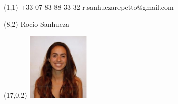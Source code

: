 \documentclass{tccv}
\begin{document}

\begin{minipage}{\textwidth} 
\begin{textblock}{6.5}(1,1)
    {+33 07 83 88 33 32}
    {r.sanhuezarepetto@gmail.com}
\end{textblock}

\begin{textblock}{5}(8,2)
     Roc\'io Sanhueza
\end{textblock}

\begin{textblock}{21}(17,0.2)
		\includegraphics[width=3cm]{../Figure/Rocio1.png}
\end{textblock}  

\end{minipage}

\vspace*{-1cm}
\end{document}
